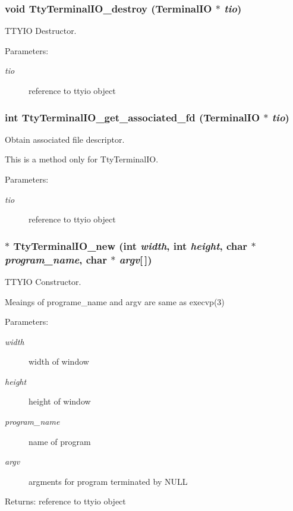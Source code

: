 \subsubsection{\setlength{\rightskip}{0pt plus 5cm}void Tty\-Terminal\-IO\_\-destroy ({\bf Terminal\-IO} $\ast$ {\em tio})}\label{ttyio_8h_a1}


TTYIO Destructor.

\begin{Desc}
\item[Parameters:]
\begin{description}
\item[{\em tio}]reference to ttyio object \end{description}
\end{Desc}
\subsubsection{\setlength{\rightskip}{0pt plus 5cm}int Tty\-Terminal\-IO\_\-get\_\-associated\_\-fd ({\bf Terminal\-IO} $\ast$ {\em tio})}\label{ttyio_8h_a2}


Obtain associated file descriptor.

\par
 This is a method only for Tty\-Terminal\-IO. \begin{Desc}
\item[Parameters:]
\begin{description}
\item[{\em tio}]reference to ttyio object \end{description}
\end{Desc}
\subsubsection{$\ast$ Tty\-Terminal\-IO\_\-new (int {\em width}, int {\em height}, char $\ast$ {\em program\_\-name}, char $\ast$ {\em argv}[$\,$])}\label{ttyio_8h_a0}


TTYIO Constructor.

\par
 Meaings of programe\_\-name and argv are same as execvp(3) \begin{Desc}
\item[Parameters:]
\begin{description}
\item[{\em width}]width of window \item[{\em height}]height of window \item[{\em program\_\-name}]name of program \item[{\em argv}]argments for program terminated by NULL \end{description}
\end{Desc}
\begin{Desc}
\item[Returns:]reference to ttyio object \end{Desc}
